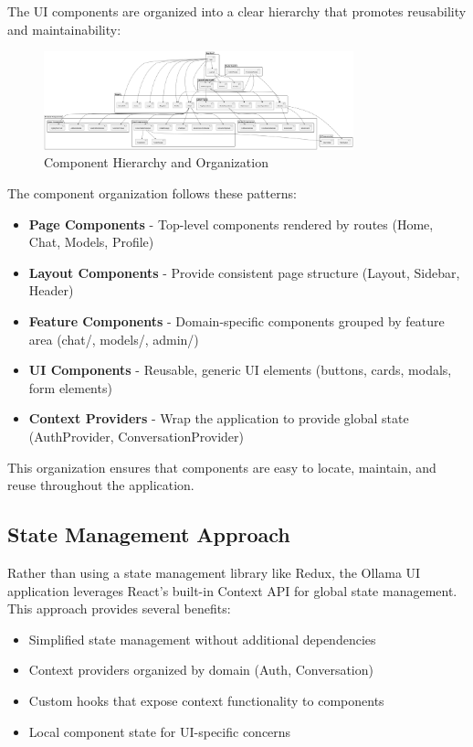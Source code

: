The UI components are organized into a clear hierarchy that promotes reusability and maintainability:

\begin{figure}[h]
    \centering
    \includegraphics[width=0.8\textwidth]{./Chapter07/figures/component_hierarchy.png}
    \caption{Component Hierarchy and Organization}
    \label{fig:component-hierarchy}
\end{figure}

The component organization follows these patterns:

\begin{itemize}
  \item \textbf{Page Components} - Top-level components rendered by routes (Home, Chat, Models, Profile)
  \item \textbf{Layout Components} - Provide consistent page structure (Layout, Sidebar, Header)
  \item \textbf{Feature Components} - Domain-specific components grouped by feature area (chat/, models/, admin/)
  \item \textbf{UI Components} - Reusable, generic UI elements (buttons, cards, modals, form elements)
  \item \textbf{Context Providers} - Wrap the application to provide global state (AuthProvider, ConversationProvider)
\end{itemize}

This organization ensures that components are easy to locate, maintain, and reuse throughout the application.

\subsection{State Management Approach}

Rather than using a state management library like Redux, the Ollama UI application leverages React's built-in Context API for global state management. This approach provides several benefits:

\begin{itemize}
  \item Simplified state management without additional dependencies
  \item Context providers organized by domain (Auth, Conversation)
  \item Custom hooks that expose context functionality to components
  \item Local component state for UI-specific concerns
\end{itemize}

